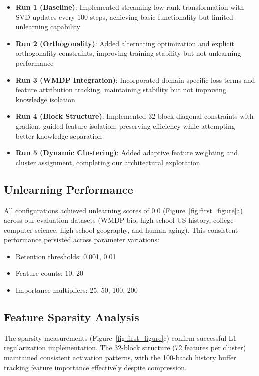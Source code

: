 \documentclass{article} %
\begin{document}
\begin{itemize}
    \item \textbf{Run 1 (Baseline)}: Implemented streaming low-rank transformation with SVD updates every 100 steps, achieving basic functionality but limited unlearning capability
    \item \textbf{Run 2 (Orthogonality)}: Added alternating optimization and explicit orthogonality constraints, improving training stability but not unlearning performance
    \item \textbf{Run 3 (WMDP Integration)}: Incorporated domain-specific loss terms and feature attribution tracking, maintaining stability but not improving knowledge isolation
    \item \textbf{Run 4 (Block Structure)}: Implemented 32-block diagonal constraints with gradient-guided feature isolation, preserving efficiency while attempting better knowledge separation
    \item \textbf{Run 5 (Dynamic Clustering)}: Added adaptive feature weighting and cluster assignment, completing our architectural exploration
\end{itemize}

\subsection{Unlearning Performance}
All configurations achieved unlearning scores of 0.0 (Figure~\ref{fig:first_figure}a) across our evaluation datasets (WMDP-bio, high school US history, college computer science, high school geography, and human aging). This consistent performance persisted across parameter variations:
\begin{itemize}
    \item Retention thresholds: 0.001, 0.01
    \item Feature counts: 10, 20
    \item Importance multipliers: 25, 50, 100, 200
\end{itemize}

\subsection{Feature Sparsity Analysis}
The sparsity measurements (Figure~\ref{fig:first_figure}c) confirm successful L1 regularization implementation. The 32-block structure (72 features per cluster) maintained consistent activation patterns, with the 100-batch history buffer tracking feature importance effectively despite compression.
\end{document}
